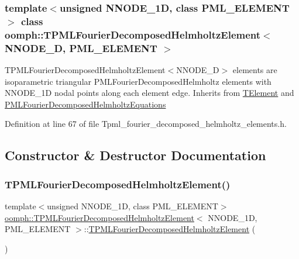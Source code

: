 \subsubsection*{template$<$unsigned N\+N\+O\+D\+E\+\_\+1D, class P\+M\+L\+\_\+\+E\+L\+E\+M\+E\+NT$>$\newline
class oomph\+::\+T\+P\+M\+L\+Fourier\+Decomposed\+Helmholtz\+Element$<$ N\+N\+O\+D\+E\+\_\+D, P\+M\+L\+\_\+\+E\+L\+E\+M\+E\+N\+T $>$}

T\+P\+M\+L\+Fourier\+Decomposed\+Helmholtz\+Element$<$\+N\+N\+O\+D\+E\+\_\+D$>$ elements are isoparametric triangular P\+M\+L\+Fourier\+Decomposed\+Helmholtz elements with N\+N\+O\+D\+E\+\_\+1D nodal points along each element edge. Inherits from \hyperlink{classoomph_1_1TElement}{T\+Element} and \hyperlink{classoomph_1_1PMLFourierDecomposedHelmholtzEquations}{P\+M\+L\+Fourier\+Decomposed\+Helmholtz\+Equations} 

Definition at line 67 of file Tpml\+\_\+fourier\+\_\+decomposed\+\_\+helmholtz\+\_\+elements.\+h.



\subsection{Constructor \& Destructor Documentation}
\mbox{\label{classoomph_1_1TPMLFourierDecomposedHelmholtzElement_a837e85a5e8ada4a8088d0bc251e758e1}} 
\subsubsection{\texorpdfstring{T\+P\+M\+L\+Fourier\+Decomposed\+Helmholtz\+Element()}{TPMLFourierDecomposedHelmholtzElement()}\hspace{0.1cm}{\footnotesize\ttfamily [1/2]}}
{\footnotesize\ttfamily template$<$unsigned N\+N\+O\+D\+E\+\_\+1D, class P\+M\+L\+\_\+\+E\+L\+E\+M\+E\+NT$>$ \\
\hyperlink{classoomph_1_1TPMLFourierDecomposedHelmholtzElement}{oomph\+::\+T\+P\+M\+L\+Fourier\+Decomposed\+Helmholtz\+Element}$<$ N\+N\+O\+D\+E\+\_\+1D, P\+M\+L\+\_\+\+E\+L\+E\+M\+E\+NT $>$\+::\hyperlink{classoomph_1_1TPMLFourierDecomposedHelmholtzElement}{T\+P\+M\+L\+Fourier\+Decomposed\+Helmholtz\+Element} (\begin{DoxyParamCaption}{ }\end{DoxyParamCaption})\hspace{0.3cm}{\ttfamily [inline]}}



